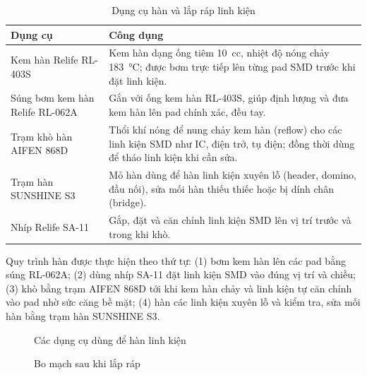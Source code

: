 \begin{table}[H]
\centering
\caption{Dụng cụ hàn và lắp ráp linh kiện}
\label{tab:solder_equipment}
\begin{tabularx}{\linewidth}{|l|X|}
\hline
\textbf{Dụng cụ} & \textbf{Công dụng} \\
\hline
Kem hàn Relife RL-403S & Kem hàn dạng ống tiêm \SI{10}{cc}, nhiệt độ nóng chảy \SI{183}{\celsius}; được bơm trực tiếp lên từng pad SMD trước khi đặt linh kiện. \\
\hline
Súng bơm kem hàn Relife RL-062A & Gắn với ống kem hàn RL-403S, giúp định lượng và đưa kem hàn lên pad chính xác, đều tay. \\
\hline
Trạm khò hàn AIFEN 868D & Thổi khí nóng để nung chảy kem hàn (reflow) cho các linh kiện SMD như IC, điện trở, tụ điện; đồng thời dùng để tháo linh kiện khi cần sửa. \\
\hline
Trạm hàn SUNSHINE S3 & Mỏ hàn dùng để hàn linh kiện xuyên lỗ (header, domino, đầu nối), sửa mối hàn thiếu thiếc hoặc bị dính chân (bridge). \\
\hline
Nhíp Relife SA-11 & Gắp, đặt và căn chỉnh linh kiện SMD lên vị trí trước và trong khi khò. \\
\hline
\end{tabularx}
\end{table}

Quy trình hàn được thực hiện theo thứ tự: (1) bơm kem hàn lên các pad bằng súng RL-062A; (2) dùng nhíp SA-11 đặt linh kiện SMD vào đúng vị trí và chiều; (3) khò bằng trạm AIFEN 868D tới khi kem hàn chảy và linh kiện tự căn chỉnh vào pad nhờ sức căng bề mặt; (4) hàn các linh kiện xuyên lỗ và kiểm tra, sửa mối hàn bằng trạm hàn SUNSHINE S3.

\begin{figure}[H]
\centering
{}
\caption{Các dụng cụ dùng để hàn linh kiện}
\label{fig:solder_equipment}
\end{figure}

\begin{figure}[H]
\centering
{}
\caption{Bo mạch \proj{} sau khi lắp ráp}
\label{fig:pcbthucte}
\end{figure}
